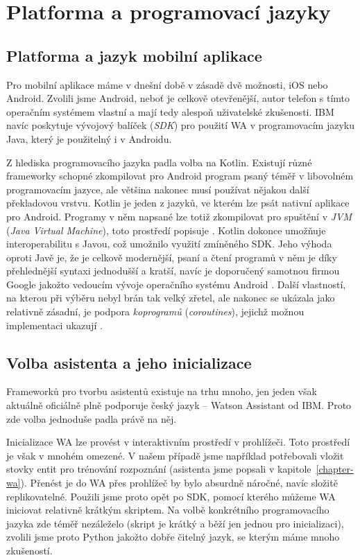 \section{Platforma a programovací jazyky}\label{analysis}

\subsection{Platforma a jazyk mobilní aplikace}
Pro mobilní aplikace máme v dnešní době v zásadě dvě možnosti, iOS nebo Android.
Zvolili jsme Android, neboť je celkově otevřenější, autor telefon s tímto
operačním systémem vlastní a mají tedy alespoň uživatelské zkušenosti. IBM navíc
poskytuje vývojový balíček (\textit{SDK}) pro použití WA v programovacím
jazyku Java, který je použitelný i v Androidu.

Z hlediska programovacího jazyka padla volba na Kotlin. Existují různé frameworky
schopné zkompilovat pro Android program psaný téměř v libovolném programovacím
jazyce, ale většina nakonec musí používat nějakou další překladovou vrstvu.
Kotlin je jeden z jazyků, ve kterém lze psát nativní aplikace pro Android. Programy
v něm napsané lze totiž zkompilovat pro spuštění v \textit{JVM} (\textit{Java Virtual Machine}),
toto prostředí popisuje \citet{prof_tejinder_singh_hotspot_2014}.
Kotlin dokonce umožňuje interoperabilitu s Javou, což umožnilo
využití zmíněného SDK. Jeho výhoda oproti Javě je, že je celkově modernější,
psaní a čtení programů v něm je díky přehlednější syntaxi jednodušší a kratší,
navíc je doporučený samotnou firmou Google jakožto vedoucím vývoje operačního
systému Android \citep{android_blog}.
Další vlastností, na kterou při výběru nebyl brán tak velký
zřetel, ale nakonec se ukázala jako relativně zásadní, je podpora \textit{koprogramů}
(\textit{coroutines}), jejichž možnou implementaci ukazují \citet{theory_practice_coroutines}.

\subsection{Volba asistenta a jeho inicializace}
Frameworků pro tvorbu asistentů existuje na trhu mnoho, jen jeden však aktuálně oficiálně plně
podporuje český jazyk -- Watson Assistant od IBM. Proto zde volba jednoduše
padla právě na něj.

Inicializace WA lze provést v interaktivním prostředí v prohlížeči. Toto
prostředí je však v mnohém omezené. V našem případě jsme například potřebovali
vložit stovky entit pro trénování rozpoznání (asistenta jsme popsali v
kapitole~\ref{chapter-wa}). Přenést je do WA přes prohlížeč
by bylo absurdně náročné, navíc složitě replikovatelné. Použili jsme proto opět
po SDK, pomocí kterého můžeme WA iniciovat relativně krátkým skriptem. Na volbě
konkrétního programovacího jazyka zde téměř nezáleželo (skript je krátký a běží
jen jednou pro inicializaci), zvolili jsme proto Python jakožto dobře čitelný
jazyk, se kterým máme mnoho zkušeností.

